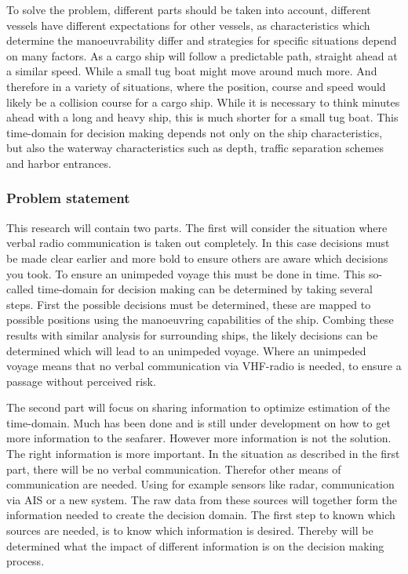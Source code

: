 To solve the problem, different parts should be taken into account, different vessels have different expectations for other vessels, as characteristics which determine the manoeuvrability differ and strategies for specific situations depend on many factors. As a cargo ship will follow a predictable path, straight ahead at a similar speed. While a small tug boat might move around much more. And therefore in a variety of situations, where the position, course and speed would likely be a collision course for a cargo ship. While it is necessary to think minutes ahead with a long and heavy ship, this is much shorter for a small tug boat. This time-domain for decision making depends not only on the ship characteristics, but also the waterway characteristics such as depth, traffic separation schemes and harbor entrances.

\subsubsection*{Problem statement}
This research will contain two parts. The first will consider the situation where verbal radio communication is taken out completely. In this case decisions must be made clear earlier and more bold to ensure others are aware which decisions you took. To ensure an unimpeded voyage this must be done in time. This so-called time-domain for decision making can be determined by taking several steps. First the possible decisions must be determined, these are mapped to possible positions using the manoeuvring capabilities of the ship. Combing these results with similar analysis for surrounding ships, the likely decisions can be determined which will lead to an unimpeded voyage. Where an unimpeded voyage means that no verbal communication via VHF-radio is needed, to ensure a passage without perceived risk.

The second part will focus on sharing information to optimize estimation of the time-domain. Much has been done and is still under development on how to get more information to the seafarer. However more information is not the solution. The right information is more important. In the situation as described in the first part, there will be no verbal communication. Therefor other means of communication are needed. Using for example sensors like radar, communication via AIS or a new system. The raw data from these sources will together form the information needed to create the decision domain. The first step to known which sources are needed, is to know which information is desired. Thereby will be determined what the impact of different information is on the decision making process.

